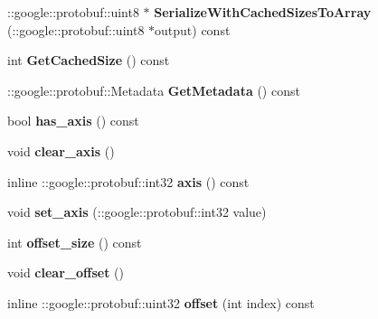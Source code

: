 \begin{DoxyCompactItemize}
\mbox{\label{classcaffe_1_1_crop_parameter_af642c219d78c2a1fa0bc5ca4d6e00bbd}} 
\+::google\+::protobuf\+::uint8 $\ast$ {\bfseries Serialize\+With\+Cached\+Sizes\+To\+Array} (\+::google\+::protobuf\+::uint8 $\ast$output) const
\item 
\mbox{\label{classcaffe_1_1_crop_parameter_a906161f986936f5024359ce0b66d7971}} 
int {\bfseries Get\+Cached\+Size} () const
\item 
\mbox{\label{classcaffe_1_1_crop_parameter_a279f56099d284b68adfde44d68a1df57}} 
\+::google\+::protobuf\+::\+Metadata {\bfseries Get\+Metadata} () const
\item 
\mbox{\label{classcaffe_1_1_crop_parameter_a92321ffb59469784991a6ec940d35483}} 
bool {\bfseries has\+\_\+axis} () const
\item 
\mbox{\label{classcaffe_1_1_crop_parameter_a10d5af89a92294f8b7e8d0ef0dcca7cd}} 
void {\bfseries clear\+\_\+axis} ()
\item 
\mbox{\label{classcaffe_1_1_crop_parameter_ad70288cc10e47656d8ab51706d27b2f5}} 
inline \+::google\+::protobuf\+::int32 {\bfseries axis} () const
\item 
\mbox{\label{classcaffe_1_1_crop_parameter_a41dd82ec4b64e5d8036c6c5205f9956c}} 
void {\bfseries set\+\_\+axis} (\+::google\+::protobuf\+::int32 value)
\item 
\mbox{\label{classcaffe_1_1_crop_parameter_ae617ba819ddad9c8325e85f0138e00bf}} 
int {\bfseries offset\+\_\+size} () const
\item 
\mbox{\label{classcaffe_1_1_crop_parameter_af79fc7f05837827e0af6b0caa9b6e0b4}} 
void {\bfseries clear\+\_\+offset} ()
\item 
\mbox{\label{classcaffe_1_1_crop_parameter_aa11164e836efa87e0edd8cea917279b1}} 
inline \+::google\+::protobuf\+::uint32 {\bfseries offset} (int index) const

\end{DoxyCompactItemize}
